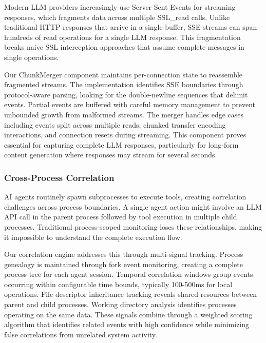 Modern LLM providers increasingly use Server-Sent Events for streaming responses, which fragments data across multiple SSL\_read calls. Unlike traditional HTTP responses that arrive in a single buffer, SSE streams can span hundreds of read operations for a single LLM response. This fragmentation breaks naive SSL interception approaches that assume complete messages in single operations.

Our ChunkMerger component maintains per-connection state to reassemble fragmented streams. The implementation identifies SSE boundaries through protocol-aware parsing, looking for the double-newline sequences that delimit events. Partial events are buffered with careful memory management to prevent unbounded growth from malformed streams. The merger handles edge cases including events split across multiple reads, chunked transfer encoding interactions, and connection resets during streaming. This component proves essential for capturing complete LLM responses, particularly for long-form content generation where responses may stream for several seconds.

\subsubsection{Cross-Process Correlation}

AI agents routinely spawn subprocesses to execute tools, creating correlation challenges across process boundaries. A single agent action might involve an LLM API call in the parent process followed by tool execution in multiple child processes. Traditional process-scoped monitoring loses these relationships, making it impossible to understand the complete execution flow.

Our correlation engine addresses this through multi-signal tracking. Process genealogy is maintained through fork event monitoring, creating a complete process tree for each agent session. Temporal correlation windows group events occurring within configurable time bounds, typically 100-500ms for local operations. File descriptor inheritance tracking reveals shared resources between parent and child processes. Working directory analysis identifies processes operating on the same data. These signals combine through a weighted scoring algorithm that identifies related events with high confidence while minimizing false correlations from unrelated system activity.